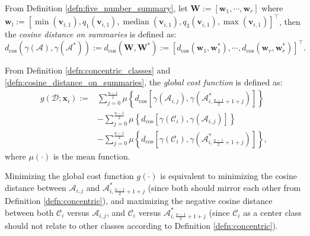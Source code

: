 \begin{defn}\label{defn:cosine_distance_on_summaries}
    From Definition \ref{defn:five_number_summary}, let $\mathbf{W}:=[\mathbf{w}_1,\cdots,\mathbf{w}_r]$ where $\mathbf{w}_l:=[\min(\mathbf{v}_{i,1}),q_1(\mathbf{v}_{i,1}),\operatorname{median}(\mathbf{v}_{i,1}),q_3(\mathbf{v}_{i,1}),\max(\mathbf{v}_{i,1})]^{\top}$, then the \textit{cosine distance on summaries} is defined as:
    \begin{equation}
        d_{\cos}(\gamma(\mathscr{A}),\gamma(\mathscr{A}^*)):=d_{\cos}(\mathbf{W},\mathbf{W}^*):=[d_{\cos}(\mathbf{w}_1,\mathbf{w}_1^*),\cdots,d_{\cos}(\mathbf{w}_r,\mathbf{w}_r^*)]^{\top}.
    \end{equation}
\end{defn}
\begin{defn}\label{defn:global_cost_function}
    From Definition \ref{defn:concentric_classes} and \ref{defn:cosine_distance_on_summaries}, the \textit{global cost function} is defined as:
    \begin{align}
        g(\mathscr{D};\mathbf{x}_{i}):=&\sum_{j=0}^{\frac{n-1}{2}}\mu\left\{d_{\cos}\left[\gamma\left(\mathscr{A}_{i,j}\right),\gamma\left(\mathscr{A}_{i,\frac{n-1}{2}+1+j}^{*}\right)\right]\right\}\nonumber\\
        &-\sum_{j=0}^{\frac{n-1}{2}}\mu\left\{d_{\cos}\left[\gamma\left(\mathscr{C}_i\right),\gamma\left(\mathscr{A}_{i,j}\right)\right]\right\}\nonumber\\
        &-\sum_{j=0}^{\frac{n-1}{2}}\mu\left\{d_{\cos}\left[\gamma\left(\mathscr{C}_i\right),\gamma\left(\mathscr{A}_{i,\frac{n-1}{2}+1+j}^{*}\right)\right]\right\},
    \end{align}
    where $\mu(\cdot)$ is the mean function.
\end{defn}

\begin{remark}
    Minimizing the global cost function $g(\cdot)$ is equivalent to minimizing the cosine distance between $\mathscr{A}_{i,j}$ and $\mathscr{A}_{i,\frac{n-1}{2}+1+j}^{*}$ (since both should mirror each other from Definition \ref{defn:concentric}), and maximizing the negative cosine distance between both $\mathscr{C}_i$ versus $\mathscr{A}_{i,j}$, and $\mathscr{C}_i$ versus $\mathscr{A}_{i,\frac{n-1}{2}+1+j}^{*}$ (since $\mathscr{C}_i$ as a center class should not relate to other classes according to Definition \ref{defn:concentric}).
\end{remark}

